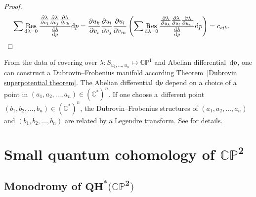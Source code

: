 \documentclass[11pt]{article}
\numberwithin{equation}{section}
\numberwithin{equation}{section}
\DeclareMathOperator*{\res}{Res}
\begin{document}
\begin{proof}
\begin{gather*}
\sum \res_{{\rm d}\lambda=0} \frac{\frac{\partial\lambda}{\partial v_i}\frac{\partial\lambda}{\partial v_j} \frac{\partial\lambda}{\partial v_k}}{\frac{{\rm d}\lambda}{{\rm d}p} }{\rm d}p=\frac{\partial u_k}{\partial v_i}\frac{\partial u_l}{\partial v_j}\frac{\partial u_l}{\partial v_m}\left(\sum \res_{{\rm d}\lambda=0} \frac{\frac{\partial\lambda}{\partial u_k}\frac{\partial\lambda}{\partial u_l} \frac{\partial\lambda}{\partial u_m}}{\frac{{\rm d}\lambda}{{\rm d}p} }{\rm d}p\right)=c_{ijk}.\tag*{\qed}
\end{gather*}
\renewcommand{\qed}{}
\end{proof}

\begin{Remark}
From the data of covering over $\lambda\colon S_{u_1,\dots, u_n}\mapsto\mathbb{CP}^1$ and Abelian differential~${\rm d}p$, one can construct a Dubrovin--Frobenius manifold according Theorem~\ref{Dubrovin superpotential theorem}. The Abelian differential ${\rm d}p$ depend on a choice of a point in $(a_1,a_2,\dots,a_n)\in(\mathbb{C}^{*})^n$. If one choose a~different point~${(b_1,b_2,\dots,b_n)\in(\mathbb{C}^{*})^n}$, the Dubrovin--Frobenius structures of $(a_1,a_2,\dots,a_n)$ and $(b_1,b_2,\dots,b_n)$ are related by a Legendre transform. See \cite[Appendix B, Chapter 5]{B.Dubrovin2} for details.
\end{Remark}

\section[Small quantum cohomology of $\mathbb{CP}^2$]{Small quantum cohomology of $\boldsymbol{\mathbb{CP}^2}$}\label{small Quantum Cohomolology}

\subsection[Monodromy of $\mathbb{CP}^2$]{Monodromy of $\boldsymbol{QH^{*}\bigl(\mathbb{CP}^2\bigr)}$}
\end{document}
